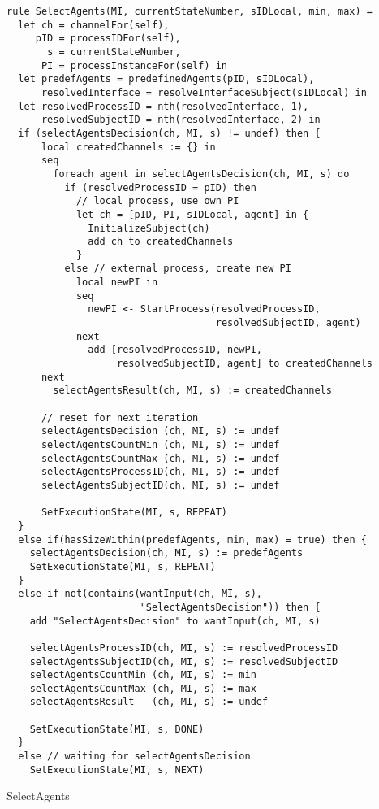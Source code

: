 \begin{listing}[H]
\begin{verbatim}
rule SelectAgents(MI, currentStateNumber, sIDLocal, min, max) =
  let ch = channelFor(self),
     pID = processIDFor(self),
       s = currentStateNumber,
      PI = processInstanceFor(self) in
  let predefAgents = predefinedAgents(pID, sIDLocal),
      resolvedInterface = resolveInterfaceSubject(sIDLocal) in
  let resolvedProcessID = nth(resolvedInterface, 1),
      resolvedSubjectID = nth(resolvedInterface, 2) in
  if (selectAgentsDecision(ch, MI, s) != undef) then {
      local createdChannels := {} in
      seq
        foreach agent in selectAgentsDecision(ch, MI, s) do
          if (resolvedProcessID = pID) then
            // local process, use own PI
            let ch = [pID, PI, sIDLocal, agent] in {
              InitializeSubject(ch)
              add ch to createdChannels
            }
          else // external process, create new PI
            local newPI in
            seq
              newPI <- StartProcess(resolvedProcessID,
                                    resolvedSubjectID, agent)
            next
              add [resolvedProcessID, newPI,
                   resolvedSubjectID, agent] to createdChannels
      next
        selectAgentsResult(ch, MI, s) := createdChannels

      // reset for next iteration
      selectAgentsDecision (ch, MI, s) := undef
      selectAgentsCountMin (ch, MI, s) := undef
      selectAgentsCountMax (ch, MI, s) := undef
      selectAgentsProcessID(ch, MI, s) := undef
      selectAgentsSubjectID(ch, MI, s) := undef

      SetExecutionState(MI, s, REPEAT)
  }
  else if(hasSizeWithin(predefAgents, min, max) = true) then {
    selectAgentsDecision(ch, MI, s) := predefAgents
    SetExecutionState(MI, s, REPEAT)
  }
  else if not(contains(wantInput(ch, MI, s),
                       "SelectAgentsDecision")) then {
    add "SelectAgentsDecision" to wantInput(ch, MI, s)

    selectAgentsProcessID(ch, MI, s) := resolvedProcessID
    selectAgentsSubjectID(ch, MI, s) := resolvedSubjectID
    selectAgentsCountMin (ch, MI, s) := min
    selectAgentsCountMax (ch, MI, s) := max
    selectAgentsResult   (ch, MI, s) := undef

    SetExecutionState(MI, s, DONE)
  }
  else // waiting for selectAgentsDecision
    SetExecutionState(MI, s, NEXT)
\end{verbatim}
\caption{SelectAgents}
\label{lst:asm:SelectAgents}
\end{listing}

\normalsize
\captionsetup{font=normalsize}
